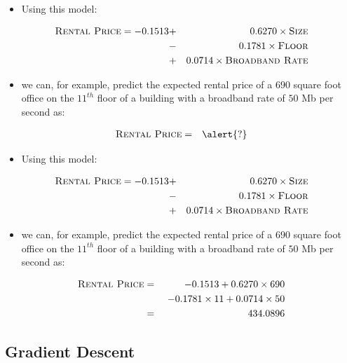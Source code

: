 \documentclass[xcolor={table}]{beamer}
\newcommand{\featN}[1]{\textsc{#1}}
\begin{document}
 \begin{frame} 
\begin{itemize}
\item Using this model:
\end{itemize}
 \begin{eqnarray*}
	\featN{Rental Price} =  -0.1513 	 &+&  0.6270 \times \featN{Size}\\
			& - &  0.1781 \times \featN{Floor} \\	 														& + & 0.0714 \times \featN{Broadband~Rate}
\end{eqnarray*}
\begin{itemize}
\item we can, for example, predict the expected rental price of a $690$ square foot office on the $11^{th}$ floor of a building with a broadband rate of $50$ Mb per second as:
\end{itemize}
\begin{eqnarray*}
	\featN{Rental~Price} & = & \alert{?}\\
\end{eqnarray*}
\end{frame} 

 \begin{frame} 
\begin{itemize}
\item Using this model:
\end{itemize}
 \begin{eqnarray*}
	\featN{Rental Price} =  -0.1513 	 &+&  0.6270 \times \featN{Size}\\
			& - &  0.1781 \times \featN{Floor} \\	 														& + & 0.0714 \times \featN{Broadband~Rate}
\end{eqnarray*}
\begin{itemize}
\item we can, for example, predict the expected rental price of a $690$ square foot office on the $11^{th}$ floor of a building with a broadband rate of $50$ Mb per second as:
\end{itemize}
\begin{eqnarray*}
	\featN{Rental~Price} & = & -0.1513 + 0.6270 \times 690\\
	& ~& ~-0.1781 \times 11 + 0.0714 \times 50 \\
	 & = & 434.0896
\end{eqnarray*}
\end{frame} 

\subsection{Gradient Descent}
\end{document}
